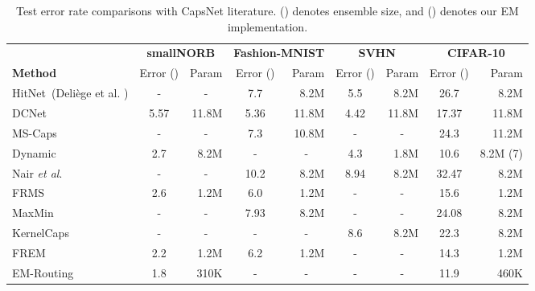 \documentclass[letterpaper]{article} \usepackage{aaai20}  \usepackage{times}  \usepackage{helvet} \usepackage{courier}  \usepackage[hyphens]{url}  \usepackage{graphicx} \urlstyle{rm} \def\UrlFont{\rm}  \usepackage{graphicx}  \frenchspacing  \setlength{\pdfpagewidth}{8.5in}  \setlength{\pdfpageheight}{11in}  \nocopyright
\begin{document}
\begin{table*}[t]
\caption{Test error rate comparisons with CapsNet literature. () denotes ensemble size, and () denotes our EM implementation.}
\footnotesize
    \begin{tabular}{lcrcrcrcr}
        \toprule
        & \multicolumn{2}{c}{\textbf{smallNORB}} & \multicolumn{2}{c}{\textbf{Fashion-MNIST}} & \multicolumn{2}{c}{\textbf{SVHN}} & \multicolumn{2}{c}{\textbf{CIFAR-10}} \\
        \textbf{Method} & Error () & Param & Error () & Param & Error () & Param & Error () & Param \\
        \midrule
        HitNet~\scriptsize{(Deliège et al. \citeyear{deliege2019effective})} & \multicolumn{1}{c}{-} & \multicolumn{1}{c}{-} & 7.7  & 8.2M & 5.5 & 8.2M & 26.7 & 8.2M \\
        DCNet~\scriptsize{\cite{phaye2018dense}} & 5.57 & 11.8M & 5.36 & 11.8M & 4.42 & 11.8M & 17.37 & 11.8M \\
        MS-Caps~\scriptsize{\cite{xiang2018ms}} & \multicolumn{1}{c}{-} & \multicolumn{1}{c}{-} & 7.3 & 10.8M & \multicolumn{1}{c}{-} & \multicolumn{1}{c}{-} & 24.3 & 11.2M \\
        Dynamic~\scriptsize{\cite{sabour2017dynamic}} & 2.7 & 8.2M & \multicolumn{1}{c}{-} & \multicolumn{1}{c}{-} & 4.3 & 1.8M & 10.6 & 8.2M \scriptsize{(7)} \\
        Nair \textit{et al}.~\scriptsize{\cite{nair2018pushing}} & \multicolumn{1}{c}{-} & \multicolumn{1}{c}{-} & 10.2 & 8.2M & 8.94 & 8.2M & 32.47 & 8.2M \\
        FRMS~\scriptsize{\cite{zhang2018fast}} & 2.6 & 1.2M & 6.0 & 1.2M & \multicolumn{1}{c}{-} & \multicolumn{1}{c}{-} & 15.6 & 1.2M \\
        MaxMin~\scriptsize{\cite{zhao2019capsule}} & \multicolumn{1}{c}{-} & \multicolumn{1}{c}{-} & 7.93 & 8.2M & \multicolumn{1}{c}{-} & \multicolumn{1}{c}{-} & 24.08 & 8.2M \\
        KernelCaps~\scriptsize{\cite{killian2019kernelized}} & \multicolumn{1}{c}{-} & \multicolumn{1}{c}{-} & \multicolumn{1}{c}{-} & \multicolumn{1}{c}{-} & 8.6 & 8.2M & 22.3 & 8.2M \\
        FREM~\scriptsize{\cite{zhang2018fast}} & 2.2 & 1.2M & 6.2 & 1.2M & \multicolumn{1}{c}{-} & \multicolumn{1}{c}{-} & 14.3 & 1.2M \\
        EM-Routing~\scriptsize{\cite{hinton2018matrix}} & 1.8 & 310K & \multicolumn{1}{c}{-} & \multicolumn{1}{c}{-} & \multicolumn{1}{c}{-} & \multicolumn{1}{c}{-} & 11.9 & 460K \\

\end{tabular}
\end{table*}
\end{document}
